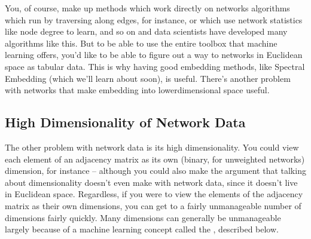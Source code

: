 \documentclass[letterpaper,10pt,english]{jupyterBook}
\begin{document}
\noindent{}

\sphinxAtStartPar
You, of course,  make up methods which work directly on networks \sphinxhyphen{} algorithms which run by traversing along edges, for instance, or which use network statistics like node degree to learn, and so on \sphinxhyphen{} and data scientists have developed many algorithms like this. But to be able to use the entire toolbox that machine learning offers, you’d like to be able to figure out a way to  networks in Euclidean space as tabular data. This is why having good embedding methods, like Spectral Embedding (which we’ll learn about soon), is useful. There’s another problem with networks that make embedding into lower\sphinxhyphen{}dimensional space useful.


\subsection{High Dimensionality of Network Data}
\label{\detokenize{representations/ch6/why-embed-networks:high-dimensionality-of-network-data}}
\sphinxAtStartPar
The other problem with network data is its high dimensionality. You could view each element of an adjacency matrix as its own (binary, for unweighted networks) dimension, for instance – although you could also make the argument that talking about dimensionality doesn’t even make  with network data, since it doesn’t live in Euclidean space. Regardless, if you were to view the elements of the adjacency matrix as their own dimensions, you can get to a fairly unmanageable number of dimensions fairly quickly. Many dimensions can generally be unmanageable largely because of a machine learning concept called the , described below.
\end{document}
